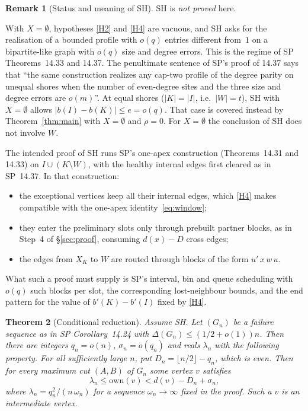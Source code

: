 \documentclass[11pt]{article}
\newtheorem{theorem}{Theorem}[section]
\theoremstyle{definition}
\newtheorem{remark}[theorem]{Remark}
\newcommand{\own}{\mathrm{own}}
\begin{document}
\begin{remark}[Status and meaning of SH]\label{rem:SH}
SH is \emph{not proved} here.

With $X=\emptyset$, hypotheses \ref{H2} and \ref{H4} are vacuous, and SH asks for the realisation of a bounded profile with $o(q)$ entries different from~$1$ on a bipartite-like graph with $o(q)$ size and degree errors. This is the regime of SP Theorems~14.33 and 14.37. The penultimate sentence of SP's proof of 14.37 says that ``the same construction realizes any cap-two profile of the degree parity on unequal shores when the number of even-degree sites and the three size and degree errors are $o(m)$''. At equal shores ($|K|=|I|$, i.e.\ $|W|=t$), SH with $X=\emptyset$ allows $|b(I)-b(K)|\le e=o(q)$. That case is covered instead by Theorem~\ref{thm:main} with $X=\emptyset$ and $\rho=0$. For $X=\emptyset$ the conclusion of SH does not involve $W$.

The intended proof of SH runs SP's one-apex construction (Theorems~14.31 and 14.33) on $I\cup(K\setminus W)$, with the healthy internal edges first cleared as in SP~14.37. In that construction:
\begin{itemize}[nosep]
\item the exceptional vertices keep all their internal edges, which \ref{H4} makes compatible with the one-apex identity~\eqref{eq:window};
\item they enter the preliminary slots only through prebuilt partner blocks, as in Step~4 of \S\ref{sec:proof}, consuming $d(x)-D$ cross edges;
\item the edges from $X_K$ to $W$ are routed through blocks of the form $u'\,x\,w\,u$.
\end{itemize}
What such a proof must supply is SP's interval, bin and queue scheduling with $o(q)$ such blocks per slot, the corresponding lost-neighbour bounds, and the end pattern for the value of $b'(K)-b'(I)$ fixed by \ref{H4}.
\end{remark}

\begin{theorem}[Conditional reduction]\label{thm:conditional}
Assume SH. Let $(G_n)$ be a failure sequence as in SP Corollary~14.24 with $\Delta(G_n)\le(1/2+o(1))n$. Then there are integers $q_n=o(n)$, $\sigma_n=o(q_n)$ and reals $\lambda_n$ with the following property. For all sufficiently large $n$, put $D_n=\lfloor n/2\rfloor-q_n$, which is even. Then for every maximum cut $(A,B)$ of $G_n$ some vertex $v$ satisfies
\[
\lambda_n\le\own(v)<d(v)-D_n+\sigma_n ,
\]
where $\lambda_n=q_n^2/(n\,\omega_n)$ for a sequence $\omega_n\to\infty$ fixed in the proof. Such a $v$ is an \emph{intermediate vertex}.
\end{theorem}
\end{document}
